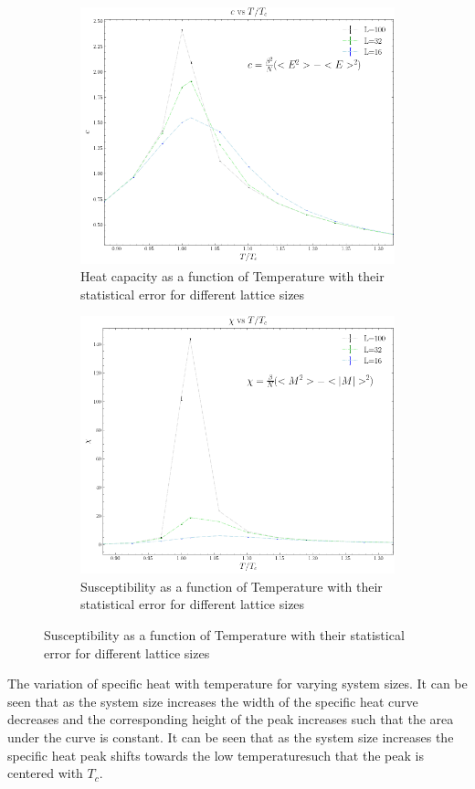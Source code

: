 \documentclass[article]{revtex4}
\begin{document}
\begin{figure}[h!]
\begin{subfigure}{.5\textwidth}
  \centering
  \includegraphics[width=0.7\linewidth]{heat_vs_T_L.png}
  \caption{Heat capacity as a function of Temperature with their statistical error for different lattice sizes}
\end{subfigure}%
\begin{subfigure}{.5\textwidth}
  \centering
  \includegraphics[width=0.7\linewidth]{chi_vs_T_L.png}
  \caption{Susceptibility as a function of Temperature with their statistical error for different lattice sizes}
\end{subfigure}
\end{figure}
The variation of specific heat with temperature for varying system sizes. It can be seen that as the system size increases 
the width of the specific heat curve decreases and the corresponding height of the peak increases such that the area under the curve is constant.
It can be seen that as the system size increases the specific heat peak shifts towards the low temperaturesuch that the peak is centered with $T_c$.
\end{document}
